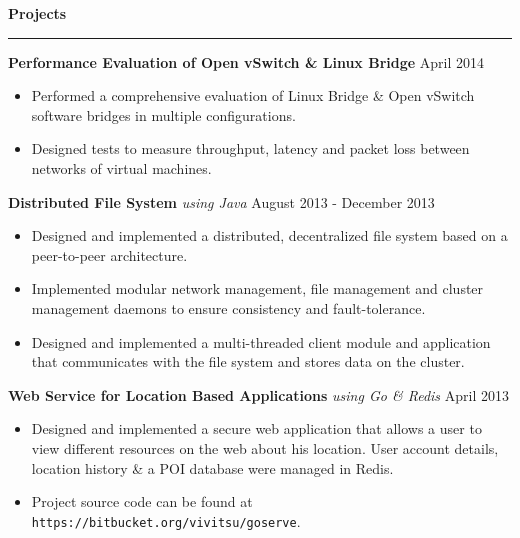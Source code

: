 \documentclass[10pt]{article}
\begin{document}
\textbf{Projects}
\smallskip
\hrule
\textbf{Performance Evaluation of Open vSwitch \& Linux Bridge} \hfill April 2014
\begin{itemize}
    \item Performed a comprehensive evaluation of Linux Bridge \& Open vSwitch software bridges
in multiple configurations.
    \item Designed tests to measure throughput, latency and packet loss between networks of virtual
machines.
\end{itemize}

\textbf{Distributed File System} \textit{using Java} \hfill August 2013 - December 2013
\begin{itemize}
    \item Designed and implemented a distributed, decentralized file system based on a peer-to-peer architecture.
    \item Implemented modular network management, file management and cluster management daemons to ensure consistency and fault-tolerance.
    \item Designed and implemented a multi-threaded client module and application that communicates with the file system and stores data on the cluster.
\end{itemize}

\textbf{Web Service for Location Based Applications} \textit{using Go \& Redis} \hfill April 2013
\begin{itemize}
    \item Designed and implemented a secure web application that allows a user to view different resources on the web about his location. User account details, location history \& a POI database were managed in Redis.
    \item Project source code can be found at \texttt{https://bitbucket.org/vivitsu/goserve}.
\end{itemize}

\end{document}
